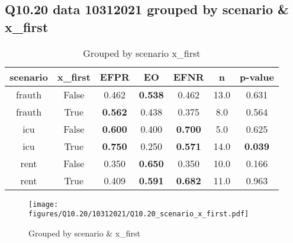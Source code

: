 \subsection{Q10.20 data 10312021 grouped by scenario \& x_first}

\begin{comment}
                     EFPR        EO      EFNR     n    pvalue
(frauth, False)  0.461538  0.538462  0.461538  13.0  0.630760
(frauth, True)   0.562500  0.437500  0.375000   8.0  0.563703
(icu, False)     0.600000  0.400000  0.700000   5.0  0.625000
(icu, True)      0.750000  0.250000  0.571429  14.0  0.039000
(rent, False)    0.350000  0.650000  0.350000  10.0  0.165518
(rent, True)     0.409091  0.590909  0.681818  11.0  0.962912
\end{comment}

\begin{table}[h]
    \centering
    \begin{tabular}{|c|c|c|c|c|c|c|}
        \hline
        scenario & x_first & EFPR & EO & EFNR & n & p-value\\
        \hline
        frauth & False & 0.462 & \textbf{0.538} & 0.462 & 13.0 & 0.631\\
		frauth & True & \textbf{0.562} & 0.438 & 0.375 & 8.0 & 0.564\\
		icu & False & \textbf{0.600} & 0.400 & \textbf{0.700} & 5.0 & 0.625\\
		icu & True & \textbf{0.750} & 0.250 & \textbf{0.571} & 14.0 & \textbf{0.039}\\
		rent & False & 0.350 & \textbf{0.650} & 0.350 & 10.0 & 0.166\\
		rent & True & 0.409 & \textbf{0.591} & \textbf{0.682} & 11.0 & 0.963\\
		
        \hline
    \end{tabular}
    \caption{Grouped by scenario x_first}
    \label{tab:my_label}
\end{table}
\begin{figure}[h]
    \centering
    \texttt{[image: figures/Q10.20/10312021/Q10.20\_scenario\_x\_first.pdf]}
    \caption{Grouped by scenario \& x_first}
    \label{fig:my_label}
\end{figure}
